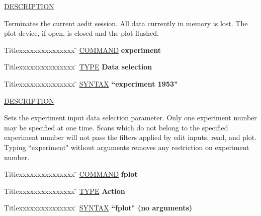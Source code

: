 \underline{DESCRIPTION}
\begin{list}{}{\setlength{\leftmargin}{0.5in}
     \setlength{\rightmargin}{0in}}
\item
Terminates the current aedit session.  All data currently in memory
is lost.  The plot device, if open, is closed and the plot flushed.
\end{list}
\vspace{.2in}

\begin{tabbing}
Titlexxxxxxxxxxxxxxx \= \kill
\underline{COMMAND} \> {\bf 	experiment} \\
\end{tabbing}

\begin{tabbing}
Titlexxxxxxxxxxxxxxx \= \kill
\underline{TYPE} \> {\bf 		Data selection} \\
\end{tabbing}

\begin{tabbing}
Titlexxxxxxxxxxxxxxx \= \kill
\underline{SYNTAX} \> {\bf 		``experiment 1953"} \\
\end{tabbing}

\underline{DESCRIPTION}
\begin{list}{}{\setlength{\leftmargin}{0.5in}
     \setlength{\rightmargin}{0in}}
\item
Sets the experiment input data selection parameter.  Only one
experiment number may be specified at one time.  Scans which do
not belong to the specified experiment number will not pass the
filters applied by edit inputs, read, and plot.  Typing ``experiment"
without arguments removes any restriction on experiment number.
\end{list}
\vspace{.2in}

\begin{tabbing}
Titlexxxxxxxxxxxxxxx \= \kill
\underline{COMMAND} \> {\bf 	fplot} \\
\end{tabbing}

\begin{tabbing}
Titlexxxxxxxxxxxxxxx \= \kill
\underline{TYPE} \> {\bf 		Action} \\
\end{tabbing}

\begin{tabbing}
Titlexxxxxxxxxxxxxxx \= \kill
\underline{SYNTAX} \> {\bf 		``fplot" (no arguments)} \\
\end{tabbing}


